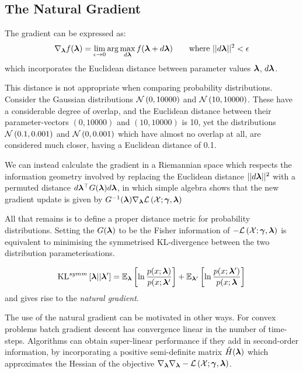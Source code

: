 \subsection*{The Natural Gradient}
The gradient can be expressed as\cite{Hoffman2012}:
\begin{align}
\nabla_\varparam f(\varparam) = \lim_{\epsilon \rightarrow 0} \arg \max_{d\varparam} f(\varparam + d\varparam) \qquad \text{where } ||d\varparam||^2 < \epsilon \label{eqn:chap1:euclidean-gradient}
\end{align}
which incorporates the Euclidean distance between parameter values $\varparam$, $d\varparam$.

This distance is not appropriate when comparing probability distributions. Consider the Gaussian distributions $\nor{0}{10000}$ and $\nor{10}{10000}$. These have a considerable degree of overlap, and the Euclidean distance between their parameter-vectors $\left(0, 10000\right)$ and $\left(10, 10000\right)$ is 10, yet the distributions $\nor{0.1}{0.001}$ and $\nor{0}{0.001}$ which have almost no overlap at all, are considered much closer, having a Euclidean distance of 0.1. 

We can instead calculate the gradient in a Riemannian space which respects the information geometry involved by replacing the Euclidean distance $||d\varparam||^2$ with a permuted distance $d\varparam\T G(\varparam) d\varparam$, in which simple algebra\cite{Amari1998} shows that the new gradient update is given by $\inv{G}(\varparam)\nabla_\varparam\elbo$

All that remains is to define a proper distance metric for probability distributions. Setting the $G(\varparam)$ to be the Fisher information of $-\elbo$ is equivalent\cite{Hoffman2012} to minimising the symmetrised KL-divergence between the two distribution parameterisations.

\begin{align}
\symmkl{\varparam}{\varparam'}
 = \ex{\ln \frac{p(x; \varparam)}{p(x; \varparam'}}{\varparam}
 + \ex{\ln \frac{p(x; \varparam')}{p(x; \varparam}}{\varparam'}
\end{align}
and gives rise to the \emph{natural gradient}\cite{Amari1998}. 

The use of the natural gradient can be motivated in other ways. For convex problems batch gradient descent has convergence linear in the number of time-steps\cite{DennisSchnabel1996}. Algorithms can obtain super-linear performance if they add in second-order information\cite{Bottou2004}, by incorporating a positive semi-definite matrix $\hat{H}(\varparam)$ which approximates the Hessian of the objective $\nabla_\varparam \nabla_\varparam -\elbo$.

